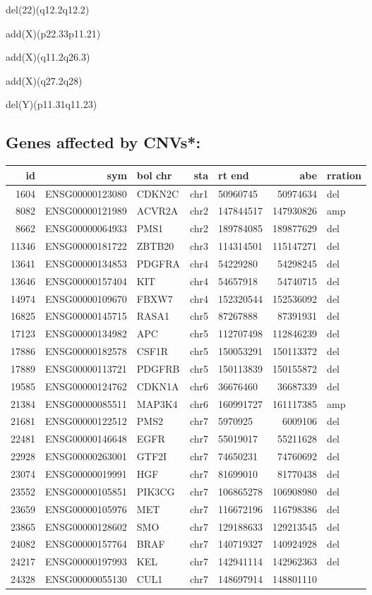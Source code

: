 \documentclass[]{article}
\begin{document}
del(22)(q12.2q12.2)

add(X)(p22.33p11.21)

add(X)(q11.2q26.3)

add(X)(q27.2q28)

del(Y)(p11.31q11.23)

\hypertarget{genes-affected-by-cnvs}{%
\subsection{Genes affected by CNVs*:}\label{genes-affected-by-cnvs}}

\begin{longtable}[]{@{}rrlrlrl@{}}
\toprule
id & sym & bol chr & sta & rt end & abe & rration\tabularnewline
\midrule
\endhead
1604 & ENSG00000123080 & CDKN2C & chr1 & 50960745 & 50974634 &
del\tabularnewline
8082 & ENSG00000121989 & ACVR2A & chr2 & 147844517 & 147930826 &
amp\tabularnewline
8662 & ENSG00000064933 & PMS1 & chr2 & 189784085 & 189877629 &
del\tabularnewline
11346 & ENSG00000181722 & ZBTB20 & chr3 & 114314501 & 115147271 &
del\tabularnewline
13641 & ENSG00000134853 & PDGFRA & chr4 & 54229280 & 54298245 &
del\tabularnewline
13646 & ENSG00000157404 & KIT & chr4 & 54657918 & 54740715 &
del\tabularnewline
14974 & ENSG00000109670 & FBXW7 & chr4 & 152320544 & 152536092 &
del\tabularnewline
16825 & ENSG00000145715 & RASA1 & chr5 & 87267888 & 87391931 &
del\tabularnewline
17123 & ENSG00000134982 & APC & chr5 & 112707498 & 112846239 &
del\tabularnewline
17886 & ENSG00000182578 & CSF1R & chr5 & 150053291 & 150113372 &
del\tabularnewline
17889 & ENSG00000113721 & PDGFRB & chr5 & 150113839 & 150155872 &
del\tabularnewline
19585 & ENSG00000124762 & CDKN1A & chr6 & 36676460 & 36687339 &
del\tabularnewline
21384 & ENSG00000085511 & MAP3K4 & chr6 & 160991727 & 161117385 &
amp\tabularnewline
21681 & ENSG00000122512 & PMS2 & chr7 & 5970925 & 6009106 &
del\tabularnewline
22481 & ENSG00000146648 & EGFR & chr7 & 55019017 & 55211628 &
del\tabularnewline
22928 & ENSG00000263001 & GTF2I & chr7 & 74650231 & 74760692 &
del\tabularnewline
23074 & ENSG00000019991 & HGF & chr7 & 81699010 & 81770438 &
del\tabularnewline
23552 & ENSG00000105851 & PIK3CG & chr7 & 106865278 & 106908980 &
del\tabularnewline
23659 & ENSG00000105976 & MET & chr7 & 116672196 & 116798386 &
del\tabularnewline
23865 & ENSG00000128602 & SMO & chr7 & 129188633 & 129213545 &
del\tabularnewline
24082 & ENSG00000157764 & BRAF & chr7 & 140719327 & 140924928 &
del\tabularnewline
24217 & ENSG00000197993 & KEL & chr7 & 142941114 & 142962363 &
del\tabularnewline
24328 & ENSG00000055130 & CUL1 & chr7 & 148697914 & 148801110 &

\end{longtable}
\end{document}
